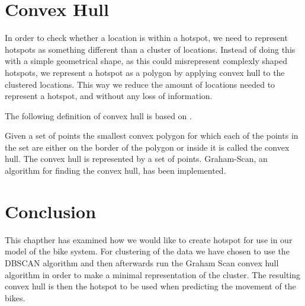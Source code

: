 \section{Convex Hull}\label{convex_hull}
In order to check whether a location is within a hotspot, we need to represent hotspots as something different than a cluster of locations.
Instead of doing this with a simple geometrical shape, as this could misrepresent complexly shaped hotspots, we represent a hotspot as a polygon by applying convex hull to the clustered locations.
This way we reduce the amount of locations needed to represent a hotspot, and without any loss of information.

The following definition of convex hull is based on \citet[section 33.3]{aadbook}.

Given a set of points the smallest convex polygon for which each of the points in the set are either on the border of the polygon or inside it is called the convex hull. \cite[33.1-5]{aadbook}
The convex hull is represented by a set of points.
Graham-Scan\cite[page 1031]{aadbook}, an algorithm for finding the convex hull, has been implemented.


\section{Conclusion}

This chapther has examined how we would like to create hotspot for use in our model of the bike system.
For clustering of the data we have chosen to use the DBSCAN algorithm and then afterwards run the Graham Scan convex hull algorithm in order to make a minimal representation of the cluster.
The resulting convex hull is then the hotspot to be used when predicting the movement of the bikes.

